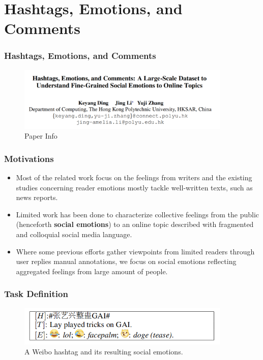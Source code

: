 \documentclass[10pt,aspectratio=43]{beamer}
\begin{document}
\section[HEC]{\textbf{Hashtags, Emotions, and Comments}}
    \begin{frame}
        \frametitle{\textbf{Hashtags, Emotions, and Comments}}
        \begin{figure}
            \centering
            \includegraphics[width=4in]{figures/HEC_info.png}
            \caption{Paper Info \cite{ding_hashtags_2020}}
            \label{fig:HEC_info}
        \end{figure}
    \end{frame}
    
    \begin{frame}
        \frametitle{\textbf{Motivations}}
        \begin{itemize}
            \item Most of the related work focus on the feelings from writers and the existing studies concerning reader emotions mostly tackle well-written texts, such as news reports.
            \item Limited work has been done to characterize collective feelings from the public (henceforth \textbf{social emotions}) to an online topic described with fragmented and colloquial social media language.
            \item Where some previous efforts gather viewpoints from limited readers through user replies manual annotations, we focus on social emotions reflecting aggregated feelings from large amount of people.
        \end{itemize}
    \end{frame}
    
    \begin{frame}
        \frametitle{\textbf{Task Definition}}
        \begin{figure}
            \centering
            \includegraphics[width=4in]{figures/HEC_task.png}
            \caption{A Weibo hashtag and its resulting social emotions.}
            \label{fig:HEC_task}
        \end{figure}
    \end{frame}
    
\end{document}
